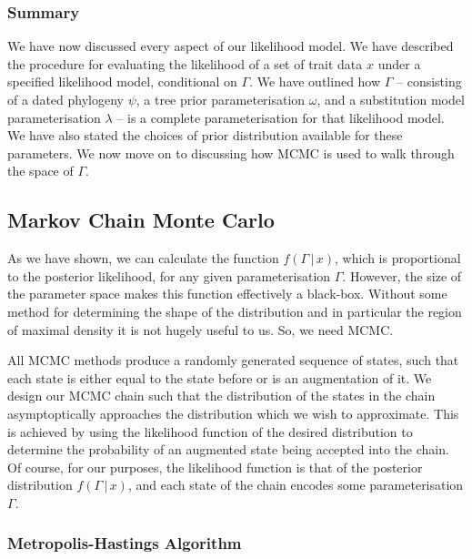 \documentclass[10pt,journal,compsoc]{IEEEtran}
\begin{document}
\subsubsection{Summary}

We have now discussed every aspect of our likelihood model. We have described the procedure for evaluating the likelihood of a set of trait data $x$ under a specified likelihood model, conditional on $\Gamma$. We have outlined how $\Gamma$  -- consisting of a dated phylogeny $\psi$, a tree prior parameterisation $\omega$, and a substitution model parameterisation $\lambda$ -- is a complete parameterisation for that likelihood model. We have also stated the choices of prior distribution available for these parameters. We now move on to discussing how MCMC is used to walk through the space of $\Gamma$.

\subsection{Markov Chain Monte Carlo}

As we have shown, we can calculate the function $f(\Gamma\,|\,x)$, which is proportional to the posterior likelihood, for any given parameterisation $\Gamma$. However, the size of the parameter space makes this function effectively a black-box. Without some method for determining the shape of the distribution and in particular the region of maximal density it is not hugely useful to us. So, we need MCMC.

All MCMC methods produce a randomly generated sequence of states, such that each state is either equal to the state before or is an augmentation of it. We design our MCMC chain such that the distribution of the states in the chain asymptoptically approaches the distribution which we wish to approximate. This is achieved by using the likelihood function of the desired distribution to determine the probability of an augmented state being accepted into the chain. Of course, for our purposes, the likelihood function is that of the posterior distribution $f(\Gamma\,|\,x)$, and each state of the chain encodes some parameterisation $\Gamma$.  


\subsubsection{Metropolis-Hastings Algorithm}
\end{document}
